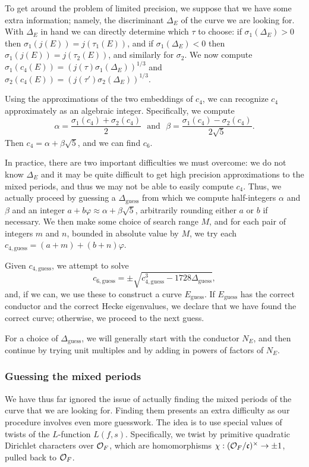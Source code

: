 \documentclass{amsart}
\newcommand{\fc}{\mathfrak{c}}
\newcommand{\OF}{\cO_F}
\begin{document}
To get around the problem of limited precision, we suppose that we have some extra information; 
namely, the discriminant $\Delta_E$ of the curve we are looking for.  With $\Delta_E$ in
hand we can directly determine which $\tau$ to choose: if $\sigma_1(\Delta_E) > 0$ then
$\sigma_1(j(E)) = j(\tau_1(E))$, and if $\sigma_1(\Delta_E) < 0$ then $\sigma_1(j(E)) = j(\tau_2(E))$,
and similarly for $\sigma_2$. We now compute $\sigma_1(c_4(E)) = (j(\tau) \sigma_1(\Delta_E))^{1/3}$
and $\sigma_2(c_4(E)) = (j(\tau') \sigma_2(\Delta_E))^{1/3}$.

Using the approximations of the two embeddings of $c_4$, we can recognize $c_4$ approximately
as an algebraic integer. Specifically, we compute
\[
    \alpha = \frac{\sigma_1(c_4) + \sigma_2(c_4)}{2}\ \ \  \text{and} \ \ \ 
    \beta = \frac{\sigma_1(c_4) - \sigma_2(c_4)}{2\sqrt{5}}.
\]
Then $c_4 = \alpha + \beta\sqrt{5}$, and we can find $c_6$.

\newcommand{\Deltaguess}{\Delta_{\textrm{guess}}}
\newcommand{\cfourguess}{c_{4,\textrm{guess}}}
\newcommand{\csixguess}{c_{6,\textrm{guess}}}
\newcommand{\Eguess}{E_\textrm{guess}}

In practice, there are two important difficulties we must overcome: we do not know
$\Delta_E$ and it may be quite difficult to get high precision approximations to the
mixed periods, and thus we may not be able to easily compute $c_4$. Thus, we actually
proceed by guessing a $\Deltaguess$ from which we
compute half-integers $\alpha$ and $\beta$ and an integer
$a + b\varphi \approx \alpha + \beta\sqrt5$, arbitrarily rounding either $a$ or $b$ if necessary.
We then make some choice of search range $M$, and for each pair of integers $m$ and $n$,
bounded in absolute value by $M$, we try each $\cfourguess = (a + m) + (b + n)\varphi$.

Given $\cfourguess$, we attempt to solve
\[
    \csixguess = \pm \sqrt{ \cfourguess^3 - 1728 \Deltaguess },
\]
and, if we can, we use these to construct a curve $\Eguess$. If $\Eguess$ has
the correct conductor and the correct Hecke eigenvalues, we declare that
we have found the correct curve; otherwise, we proceed to the next guess.

For a choice of $\Deltaguess$, we will generally start with the conductor $N_E$,
and then continue by trying unit multiples and by adding in powers of factors of $N_E$.

\subsubsection{Guessing the mixed periods}
We have thus far ignored the issue of actually finding the mixed periods of the curve that
we are looking for. Finding them presents an extra difficulty as our procedure involves
even more guesswork. The idea is to use special values of twists of the $L$-function
$L(f, s)$. Specifically, we twist by primitive quadratic Dirichlet characters over $\OF$,
which are homomorphisms $\chi : (\OF/\fc)^\times \rightarrow \pm1$, pulled back to $\OF$.
\end{document}
